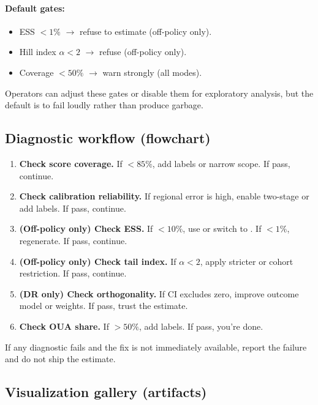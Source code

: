 \paragraph{Default gates:}
\begin{itemize}
\item ESS $< 1\%$ $\to$ refuse to estimate (off-policy only).
\item Hill index $\alpha < 2$ $\to$ refuse (off-policy only).
\item Coverage $< 50\%$ $\to$ warn strongly (all modes).
\end{itemize}

Operators can adjust these gates or disable them for exploratory analysis, but the default is to fail loudly rather than produce garbage.

\subsection{Diagnostic workflow (flowchart)}

\begin{enumerate}
\item \textbf{Check score coverage.} If $< 85\%$, add labels or narrow scope. If pass, continue.
\item \textbf{Check calibration reliability.} If regional error is high, enable two-stage \autocal{} or add labels. If pass, continue.
\item \textbf{(Off-policy only) Check ESS.} If $< 10\%$, use \simcal{} or switch to \dr. If $< 1\%$, regenerate. If pass, continue.
\item \textbf{(Off-policy only) Check tail index.} If $\alpha < 2$, apply stricter \simcal{} or cohort restriction. If pass, continue.
\item \textbf{(DR only) Check orthogonality.} If CI excludes zero, improve outcome model or weights. If pass, trust the estimate.
\item \textbf{Check OUA share.} If $> 50\%$, add labels. If pass, you're done.
\end{enumerate}

If any diagnostic fails and the fix is not immediately available, report the failure and do not ship the estimate.

\subsection{Visualization gallery (artifacts)}

